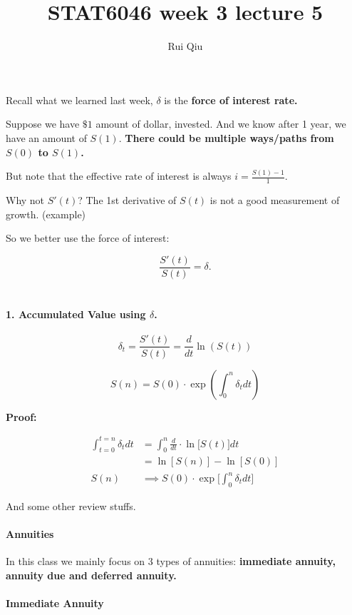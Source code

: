 \documentclass[a4paper, 11pt, twoside]{article}
\begin{document}
\title{STAT6046 week 3 lecture 5}
\author{Rui Qiu}

\maketitle

Recall what we learned last week, $\delta$ is the \textbf{force of interest rate.}

Suppose we have $\$1$ amount of dollar, invested. And we know after 1 year, we have an amount of $S(1)$. \textbf{There could be multiple ways/paths from $S(0)$ to $S(1)$.}

But note that the effective rate of interest is always $i=\frac{S(1)-1}{1}.$

Why not $S'(t)$? The 1st derivative of $S(t)$ is not a good measurement of growth. (example)

So we better use the force of interest:

\[\frac{S'(t)}{S(t)}=\delta.\]\\

\paragraph{1. Accumulated Value using $\delta$.}

\[
\delta_t=\frac{S'(t)}{S(t)}=\frac{d}{dt}\ln(S(t))
\]

\[S(n)=S(0)\cdot \exp(\int^n_0\delta_t dt)\]

\textbf{Proof:}

\[
\begin{split}
	\int^{t=n}_{t=0}\delta_t dt &= \int^n_0 \frac{d}{dt}\cdot \ln \bigg[S(t)\bigg] dt \\
	&= \ln[S(n)] - \ln[S(0)]\\
	S(n) &\implies S(0)\cdot \exp\bigg[\int^n_0\delta_t dt \bigg]
\end{split}
\]

And some other review stuffs.

\pagebreak

\paragraph{Annuities}

In this class we mainly focus on 3 types of annuities: \textbf{immediate annuity, annuity due and deferred annuity.}\\

\paragraph{Immediate Annuity}
\end{document}
